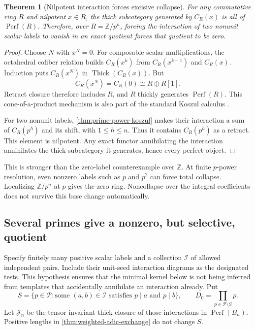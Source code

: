 \documentclass[11pt]{article}
\newtheorem{theorem}{Theorem}[section]
\theoremstyle{definition}
\theoremstyle{remark}
\begin{document}
\begin{theorem}[Nilpotent interaction forces excisive collapse]\label{thm:nilpotent-collapse}
For any commutative ring $R$ and nilpotent $x\in R$, the thick subcategory generated by $C_R(x)$ is all of $\operatorname{Perf}(R)$. Therefore, over $R=\mathbb Z/p^n$, forcing the interaction of two nonunit scalar labels to vanish in an exact quotient forces that quotient to be zero.
\end{theorem}
\begin{proof}
Choose $N$ with $x^N=0$. For composable scalar multiplications, the octahedral cofiber relation builds $C_R(x^k)$ from $C_R(x^{k-1})$ and $C_R(x)$. Induction puts $C_R(x^N)$ in $\operatorname{Thick}(C_R(x))$. But
\[
 C_R(x^N)=C_R(0)\cong R\oplus R[1].
\]
Retract closure therefore includes $R$, and $R$ thickly generates $\operatorname{Perf}(R)$. This cone-of-a-product mechanism is also part of the standard Koszul calculus \cite{StacksKoszul}.

For two nonunit labels, \cref{thm:prime-power-koszul} makes their interaction a sum of $C_R(p^h)$ and its shift, with $1\leq h\leq n$. Thus it contains $C_R(p^h)$ as a retract. This element is nilpotent. Any exact functor annihilating the interaction annihilates the thick subcategory it generates, hence every perfect object.
\end{proof}

This is stronger than the zero-label counterexample over $\mathbb Z$. At finite $p$-power resolution, even nonzero labels such as $p$ and $p^2$ can force total collapse. Localizing $\mathbb Z/p^n$ at $p$ gives the zero ring. Noncollapse over the integral coefficients does not survive this base change automatically.

\subsection{Several primes give a nonzero, but selective, quotient}

Specify finitely many positive scalar labels and a collection $\mathcal I$ of allowed independent pairs. Include their unit-seed interaction diagrams as the designated tests. This hypothesis ensures that the minimal kernel below is not being inferred from templates that accidentally annihilate an interaction already. Put
\[
 S=\{p\in\mathcal P:\text{some }(a,b)\in\mathcal I
                    \text{ satisfies }p\mid a\text{ and }p\mid b\},
 \qquad D_0=\prod_{p\in\mathcal P\setminus S}p.
\]
Let $\mathcal J_n$ be the tensor-invariant thick closure of those interactions in $\operatorname{Perf}(B_n)$. Positive lengths in \cref{thm:weighted-adic-exchange} do not change $S$.
\end{document}
